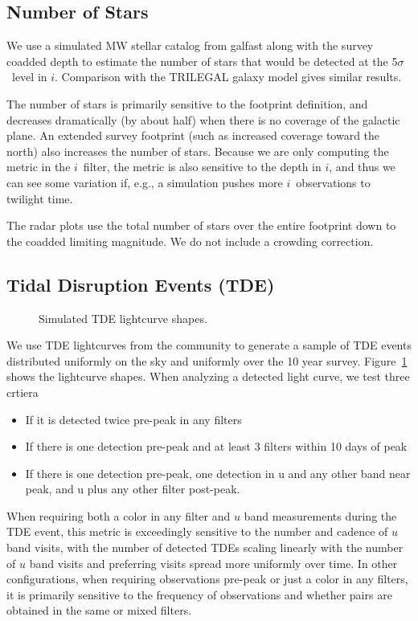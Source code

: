 \subsection{Number of Stars}

We use a simulated MW stellar catalog from galfast along with the survey coadded depth to estimate the number of stars that would be detected at the 5$\sigma$\ level in $i$. Comparison with the TRILEGAL galaxy model gives similar results.

The number of stars is primarily sensitive to the footprint definition, and decreases dramatically (by about half) when there is no coverage of the galactic plane. An extended survey footprint (such as increased coverage toward the north) also increases the number of stars. Because we are only computing the metric in the $i$\ filter, the metric is also sensitive to the depth in $i$, and thus we can see some variation if, e.g., a simulation pushes more $i$\ observations to twilight time.

The radar plots use the total number of stars over the entire footprint down to the coadded limiting magnitude. We do not include a crowding correction.

\subsection{Tidal Disruption Events (TDE)}

\begin{figure}
\caption{Simulated TDE lightcurve shapes.}\label{fig:tdelc}
\end{figure}

We use TDE lightcurves from the community to generate a sample of TDE events distributed uniformly on the sky and uniformly over the 10 year survey.  Figure~\ref{fig:tdelc} shows the lightcurve shapes. When analyzing a detected light curve, we test three crtiera
\begin{itemize}
    \item{If it is detected twice pre-peak in any filters}
    \item{If there is one detection pre-peak and at least 3 filters within 10 days of peak}
    \item{If there is one detection pre-peak, one detection in u and any other band near peak, and u plus any other filter post-peak.}
\end{itemize}

When requiring both a color in any filter and $u$ band measurements during the TDE event, this metric is exceedingly sensitive to the number and cadence of $u$ band visits, with the number of detected TDEs scaling linearly with the number of $u$ band visits and preferring visits spread more uniformly over time. In other configurations, when requiring observations pre-peak or just a color in any filters, it is primarily sensitive to the frequency of observations and whether pairs are obtained in the same or mixed filters.


